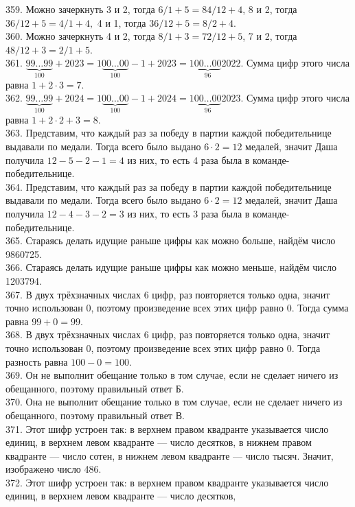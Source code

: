 \documentclass[12pt]{article}
\begin{document}
359. Можно зачеркнуть 3 и 2, тогда $6/1+5=84/12+4$, 8 и 2, тогда $36/12+5=4/1+4,$ 4 и 1, тогда $36/12+5=8/2+4.$\\
360. Можно зачеркнуть 4 и 2, тогда $8/1+3=72/12+5$, 7 и 2, тогда $48/12+3=2/1+5.$\\
361. $\underbrace{99\ldots99}_{100}+2023=1\underbrace{00\ldots00}_{100}-1+2023=1\underbrace{00\ldots00}_{96}2022.$ Сумма цифр этого числа равна $1+2\cdot3=7.$\\
362. $\underbrace{99\ldots99}_{100}+2024=1\underbrace{00\ldots00}_{100}-1+2024=1\underbrace{00\ldots00}_{96}2023.$ Сумма цифр этого числа равна $1+2\cdot2+3=8.$\\
363. Представим, что каждый раз за победу в партии каждой победительнице выдавали по медали. Тогда всего было выдано $6\cdot2=12$ медалей, значит Даша получила $12-5-2-1=4$ из них, то есть 4 раза была в команде-победительнице.\\
364. Представим, что каждый раз за победу в партии каждой победительнице выдавали по медали. Тогда всего было выдано $6\cdot2=12$ медалей, значит Даша получила $12-4-3-2=3$ из них, то есть 3 раза была в команде-победительнице.\\
365. Стараясь делать идущие раньше цифры как можно больше, найдём число 9860725.\\
366. Стараясь делать идущие раньше цифры как можно меньше, найдём число 1203794.\\
367. В двух трёхзначных числах 6 цифр, раз повторяется только одна, значит точно использован 0, поэтому произведение всех этих цифр равно 0. Тогда сумма равна $99+0=99.$\\
368. В двух трёхзначных числах 6 цифр, раз повторяется только одна, значит точно использован 0, поэтому произведение всех этих цифр равно 0. Тогда разность равна $100-0=100.$\\
369. Он не выполнит обещание только в том случае, если не сделает ничего из обещанного, поэтому правильный ответ Б.\\
370. Она не выполнит обещание только в том случае, если не сделает ничего из обещанного, поэтому правильный ответ В.\\
371. Этот шифр устроен так: в верхнем правом квадранте указывается число единиц, в верхнем левом квадранте --- число десятков,
в нижнем правом квадранте --- число сотен, в нижнем левом квадранте --- число тысяч. Значит, изображено число 486.\\
372. Этот шифр устроен так: в верхнем правом квадранте указывается число единиц, в верхнем левом квадранте --- число десятков,
\end{document}
